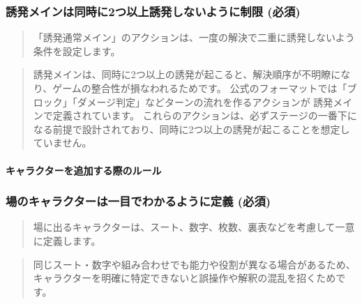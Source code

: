 \documentclass[letterpaper,10pt,dvipdfmx]{sphinxmanual}
\begin{document}
\subsubsection{誘発\textendash{}メインは同時に2つ以上誘発しないように制限 (必須)}
\label{\detokenize{appendix/guideline/customRule:id8}}
\sphinxAtStartPar
{}
\begin{quote}

\sphinxAtStartPar
「誘発\textendash{}通常\textendash{}メイン」のアクションは、一度の解決で二重に誘発しないよう条件を設定します。
\end{quote}

\sphinxAtStartPar
{}
\begin{quote}

\sphinxAtStartPar
誘発\textendash{}メインは、同時に2つ以上の誘発が起こると、解決順序が不明瞭になり、ゲームの整合性が損なわれるためです。
公式のフォーマットでは「ブロック」「ダメージ判定」などターンの流れを作るアクションが 誘発\textendash{}メインで定義されています。
これらのアクションは、必ずステージの一番下になる前提で設計されており、同時に2つ以上の誘発が起こることを想定していません。
\end{quote}


\paragraph{キャラクターを追加する際のルール}
\label{\detokenize{appendix/guideline/customRule:id9}}

\subsubsection{場のキャラクターは一目でわかるように定義 (必須)}
\label{\detokenize{appendix/guideline/customRule:id10}}
\sphinxAtStartPar
{}
\begin{quote}

\sphinxAtStartPar
場に出るキャラクターは、スート、数字、枚数、裏表などを考慮して一意に定義します。
\end{quote}

\sphinxAtStartPar
{}
\begin{quote}

\sphinxAtStartPar
同じスート・数字や組み合わせでも能力や役割が異なる場合があるため、キャラクターを明確に特定できないと誤操作や解釈の混乱を招くためです。
\end{quote}

\sphinxstepscope
\end{document}
